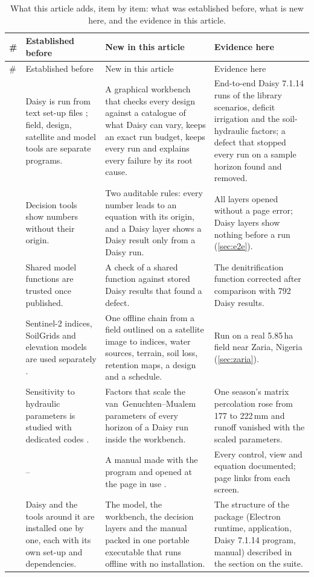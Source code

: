 {\small\setlength{\tabcolsep}{4pt}
\begin{longtable}{@{}>{\raggedright\arraybackslash}p{0.4cm}>{\raggedright\arraybackslash}p{4.5cm}>{\raggedright\arraybackslash}p{5.4cm}>{\raggedright\arraybackslash}p{5.0cm}@{}}
\caption{What this article adds, item by item: what was established before, what is new here, and the evidence in this article.}\label{tab:novelty}\\
\toprule
\# & Established before & New in this article & Evidence here\\\midrule\endfirsthead
\toprule \# & Established before & New in this article & Evidence here\\\midrule\endhead
1 & Daisy is run from text set-up files \citep{Hansen2012}; field, design, satellite and model tools are separate programs. & A graphical workbench that checks every design against a catalogue of what Daisy can vary, keeps an exact run budget, keeps every run and explains every failure by its root cause. & End-to-end Daisy 7.1.14 runs of the library scenarios, deficit irrigation and the soil-hydraulic factors; a defect that stopped every run on a sample horizon found and removed.\\
2 & Decision tools show numbers without their origin. & Two auditable rules: every number leads to an equation with its origin, and a Daisy layer shows a Daisy result only from a Daisy run. & All layers opened without a page error; Daisy layers show nothing before a run (\cref{sec:e2e}).\\
3 & Shared model functions are trusted once published. & A check of a shared function against stored Daisy results that found a defect. & The denitrification function corrected after comparison with 792 Daisy results.\\
4 & Sentinel-2 indices, SoilGrids and elevation models are used separately \citep{Drusch2012,Poggio2021}. & One offline chain from a field outlined on a satellite image to indices, water sources, terrain, soil loss, retention maps, a design and a schedule. & Run on a real 5.85\,ha field near Zaria, Nigeria (\cref{sec:zaria}).\\
5 & Sensitivity to hydraulic parameters is studied with dedicated codes \citep{Simunek2016}. & Factors that scale the van~Genuchten--Mualem parameters of every horizon of a Daisy run inside the workbench. & One season's matrix percolation rose from 177 to 222\,mm and runoff vanished with the scaled parameters.\\
6 & -- & A manual made with the program and opened at the page in use \citep{HaliluManual}. & Every control, view and equation documented; page links from each screen.\\
7 & Daisy and the tools around it are installed one by one, each with its own set-up and dependencies. & The model, the workbench, the decision layers and the manual packed in one portable executable that runs offline with no installation. & The structure of the package (Electron runtime, application, Daisy 7.1.14 program, manual) described in the section on the suite.\\
\bottomrule
\end{longtable}}
